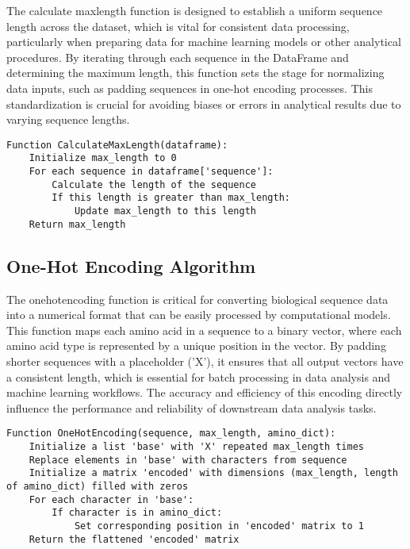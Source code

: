 \documentclass[12pt]{article}
\begin{document}
The calculate maxlength function is designed to establish a uniform sequence length across the dataset, which is vital for consistent data processing, particularly when preparing data for machine learning models or other analytical procedures. By iterating through each sequence in the DataFrame and determining the maximum length, this function sets the stage for normalizing data inputs, such as padding sequences in one-hot encoding processes. This standardization is crucial for avoiding biases or errors in analytical results due to varying sequence lengths.

\begin{lstlisting}[caption=Pseudocode: Calculate Maximum Sequence Length Function]
Function CalculateMaxLength(dataframe):
    Initialize max_length to 0
    For each sequence in dataframe['sequence']:
        Calculate the length of the sequence
        If this length is greater than max_length:
            Update max_length to this length
    Return max_length
\end{lstlisting}

\subsection{One-Hot Encoding Algorithm}

The onehotencoding function is critical for converting biological sequence data into a numerical format that can be easily processed by computational models. This function maps each amino acid in a sequence to a binary vector, where each amino acid type is represented by a unique position in the vector. By padding shorter sequences with a placeholder ('X'), it ensures that all output vectors have a consistent length, which is essential for batch processing in data analysis and machine learning workflows. The accuracy and efficiency of this encoding directly influence the performance and reliability of downstream data analysis tasks.

\begin{lstlisting}[caption=Pseudocode: One-Hot Encoding Function]
Function OneHotEncoding(sequence, max_length, amino_dict):
    Initialize a list 'base' with 'X' repeated max_length times
    Replace elements in 'base' with characters from sequence
    Initialize a matrix 'encoded' with dimensions (max_length, length of amino_dict) filled with zeros
    For each character in 'base':
        If character is in amino_dict:
            Set corresponding position in 'encoded' matrix to 1
    Return the flattened 'encoded' matrix
\end{lstlisting}
\end{document}
